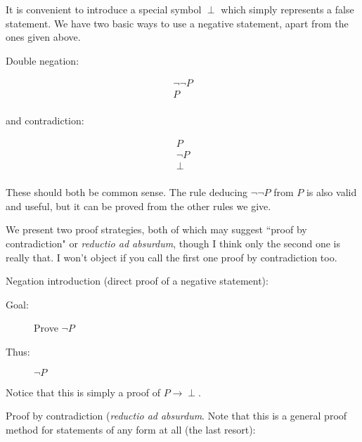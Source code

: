 \documentclass[12pt]{article}
\begin{document}
It is convenient to introduce a special symbol $\perp$ which simply represents a false statement.
\newpage
We have two basic ways to use a negative statement, apart from the ones given above.

Double negation:

$$\begin{array}{c}


\neg \neg P\\ \hline

P \\


\end{array}$$

and contradiction:

$$\begin{array}{c}
P\\

\neg P\\ \hline

\perp \\


\end{array}$$

These should both be common sense.  The rule deducing $\neg\neg P$ from $P$ is also valid and useful, but it can be proved from the other rules we give.

We present two proof strategies, both of which may suggest ``proof by contradiction" or {\em reductio ad absurdum\/}, though I think only the second one is really that.  I won't object if you call the first one proof by contradiction too.

Negation introduction (direct proof of a negative statement):

\begin{description}

\item[Goal:]  Prove $\neg P$

\item[Thus:]  $\neg P$
\end{description}

Notice that this is simply a proof of $P \rightarrow \perp$.

Proof by contradiction ({\em reductio ad absurdum\/}.  Note that this is a general proof method for statements of any form at all (the last resort):
\end{document}
